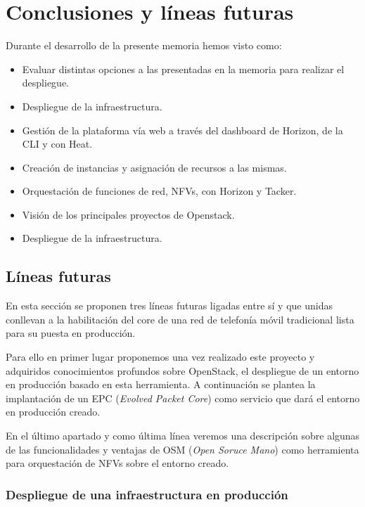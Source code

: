 \chapter{Conclusiones y líneas futuras} \label{chap:conclusiones}

Durante el desarrollo de la presente memoria hemos visto como:

\begin{itemize}
\item Evaluar distintas opciones a las presentadas en la memoria para realizar el despliegue.
\item Despliegue de la infraestructura.
\item Gestión de la plataforma vía web a través del dashboard de Horizon, de la CLI y con Heat.
\item Creación de instancias y asignación de recursos a las mismas.
\item Orquestación de funciones de red, NFVs, con Horizon y Tacker.
\item Visión de los principales proyectos de Openstack.
\item Despliegue de la infraestructura.
\end{itemize}


\section{Líneas futuras}

En esta sección se proponen tres líneas futuras ligadas entre sí y que unidas conllevan a la habilitación del core de una red de telefonía móvil tradicional lista para su puesta en producción. 

Para ello en primer lugar proponemos una vez realizado este proyecto y adquiridos conocimientos profundos sobre OpenStack, el despliegue de un entorno en producción basado en esta herramienta. A continuación se plantea la implantación de un EPC (\textit{Evolved Packet Core}) como servicio que dará el entorno en producción creado.

En el último apartado y como última línea veremos una descripción sobre algunas de las funcionalidades y ventajas de OSM (\textit{Open Soruce Mano}) como herramienta para orquestación de NFVs sobre el entorno creado.

\subsection{Despliegue de una infraestructura en producción}\label{subsec:DespliegueProduccion}

